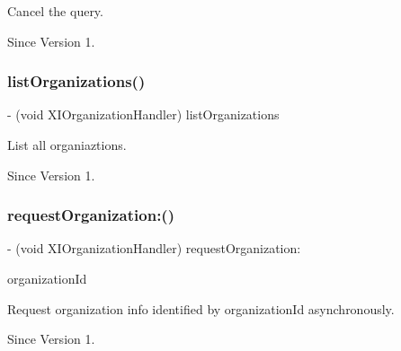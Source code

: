Cancel the query. 

\begin{DoxySince}{Since}
Version 1. 
\end{DoxySince}
\hypertarget{protocol_x_i_organization_handler_01-p_afb5982385b4013f40f7c996c32311816}{}\label{protocol_x_i_organization_handler_01-p_afb5982385b4013f40f7c996c32311816} 
\subsubsection{\texorpdfstring{list\+Organizations()}{listOrganizations()}}
{\footnotesize\ttfamily -\/ (void X\+I\+Organization\+Handler) list\+Organizations \begin{DoxyParamCaption}{ }\end{DoxyParamCaption}}



List all organiaztions. 

\begin{DoxySince}{Since}
Version 1. 
\end{DoxySince}
\hypertarget{protocol_x_i_organization_handler_01-p_a36711047f2e239abe173fbc750d25569}{}\label{protocol_x_i_organization_handler_01-p_a36711047f2e239abe173fbc750d25569} 
\subsubsection{\texorpdfstring{request\+Organization\+:()}{requestOrganization:()}}
{\footnotesize\ttfamily -\/ (void X\+I\+Organization\+Handler) request\+Organization\+: \begin{DoxyParamCaption}\item[{(N\+S\+String $\ast$)}]{organization\+Id }\end{DoxyParamCaption}}



Request organization info identified by organization\+Id asynchronously. 

\begin{DoxySince}{Since}
Version 1. 
\end{DoxySince}


